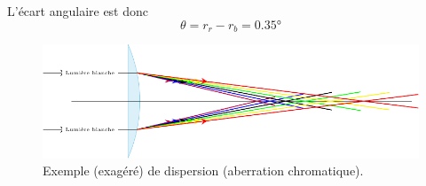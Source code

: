 \documentclass[../../main/main.tex]{subfiles}
\begin{document}
{	L'écart angulaire est donc
	\[\boxed{\theta = r_r - r_b = \ang{0.35;;}}\]

	\begin{figure}[h]
		\centering
		\includegraphics[width=.61\linewidth]{abbe_chroma.pdf}
		\captionsetup{justification=centering}
		\caption{Exemple (exagéré) de dispersion (aberration chromatique).}
		\label{fig:aberr}
	\end{figure}
}
\end{document}
